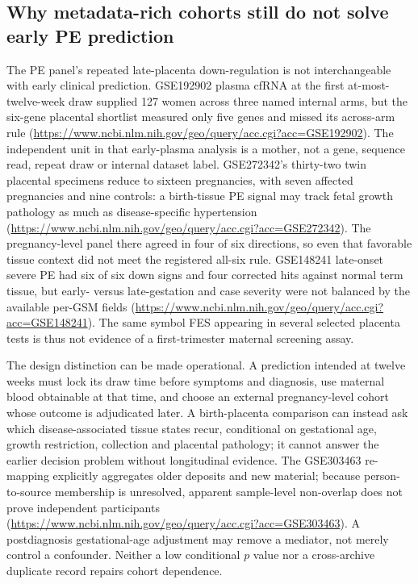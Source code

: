 \documentclass[11pt,a4paper]{article}
\begin{document}
\subsection{Why metadata-rich cohorts still do not solve early PE prediction}
The PE panel's repeated late-placenta down-regulation is not interchangeable with early clinical prediction. GSE192902 plasma cfRNA at the first at-most-twelve-week draw supplied 127 women across three named internal arms, but the six-gene placental shortlist measured only five genes and missed its across-arm rule (\url{https://www.ncbi.nlm.nih.gov/geo/query/acc.cgi?acc=GSE192902}). The independent unit in that early-plasma analysis is a mother, not a gene, sequence read, repeat draw or internal dataset label. GSE272342's thirty-two twin placental specimens reduce to sixteen pregnancies, with seven affected pregnancies and nine controls: a birth-tissue PE signal may track fetal growth pathology as much as disease-specific hypertension (\url{https://www.ncbi.nlm.nih.gov/geo/query/acc.cgi?acc=GSE272342}). The pregnancy-level panel there agreed in four of six directions, so even that favorable tissue context did not meet the registered all-six rule. GSE148241 late-onset severe PE had six of six down signs and four corrected hits against normal term tissue, but early- versus late-gestation and case severity were not balanced by the available per-GSM fields (\url{https://www.ncbi.nlm.nih.gov/geo/query/acc.cgi?acc=GSE148241}). The same symbol FES appearing in several selected placenta tests is thus not evidence of a first-trimester maternal screening assay.

The design distinction can be made operational. A prediction intended at twelve weeks must lock its draw time before symptoms and diagnosis, use maternal blood obtainable at that time, and choose an external pregnancy-level cohort whose outcome is adjudicated later. A birth-placenta comparison can instead ask which disease-associated tissue states recur, conditional on gestational age, growth restriction, collection and placental pathology; it cannot answer the earlier decision problem without longitudinal evidence. The GSE303463 re-mapping explicitly aggregates older deposits and new material; because person-to-source membership is unresolved, apparent sample-level non-overlap does not prove independent participants (\url{https://www.ncbi.nlm.nih.gov/geo/query/acc.cgi?acc=GSE303463}). A postdiagnosis gestational-age adjustment may remove a mediator, not merely control a confounder. Neither a low conditional $p$ value nor a cross-archive duplicate record repairs cohort dependence.
\end{document}

